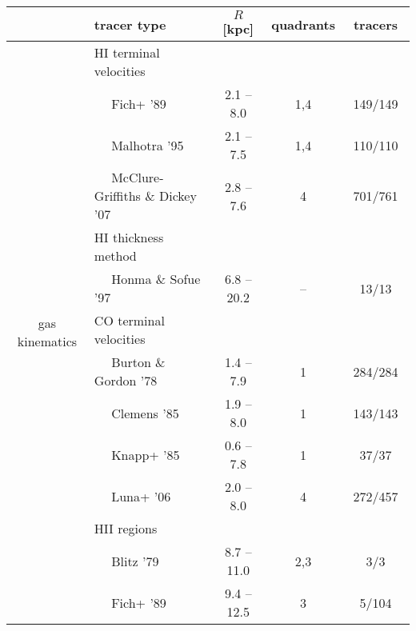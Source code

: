 \documentclass[twocolumn,prd,reprint,preprintnumbers,amsmath,amssymb,superscriptaddress,nofootinbib]{revtex4}
\begin{document}
\begin{table*}[htp]
\begin{center}
\begin{tabular}{|c|l c  c c|} 
\cline{2-5}
\multicolumn{1}{l|}{}			&	tracer type 		       							& $R$ [kpc]					& quadrants 	& $\quad$tracers$\quad$	\\
\hline
\multirow{19}{*}{gas kinematics} 	& HI terminal velocities 								&						& 		&	 					\\
					& $\quad$ Fich+ '89 \cite{Fich1989} 							& 2.1 -- 8.0					& 1,4		& 149/149	 				\\
					& $\quad$ Malhotra '95 \cite{Malhotra1995} 						& 2.1 -- 7.5				 	& 1,4		& 110/110  							\\
					& $\quad$ McClure-Griffiths \& Dickey '07 \cite{McClure-GriffithsDickey2007} 		& 2.8 -- 7.6				 	& 4		& 701/761 							\\
					& HI thickness method									&						&		&				\\
					& $\quad$ Honma \& Sofue '97 \cite{HonmaSofue1997} 					& \hspace{0.16cm}6.8 -- 20.2 			& --		& \hspace{0.16cm}13/13\hspace{0.16cm} 			\\
					& CO terminal velocities								&						& 		&					\\
					& $\quad$ Burton \& Gordon '78 \cite{BurtonGordon1978}  				& 1.4 -- 7.9				 	& 1		& 284/284  							\\
					& $\quad$ Clemens '85 \cite{Clemens1985}  						& 1.9 -- 8.0					& 1		& 143/143  						\\
					& $\quad$ Knapp+ '85 \cite{Knapp1985}  							& 0.6 -- 7.8				 	& 1		& \hspace{0.16cm}37/37\hspace{0.16cm} 					\\
					& $\quad$ Luna+ '06 \cite{Luna2006} 							& 2.0 -- 8.0				 	& 4		& 272/457  						\\
					& HII regions										&						&		&					\\
					& $\quad$ Blitz '79 \cite{Blitz1979} 							& \hspace{0.16cm}8.7 -- 11.0 			& 2,3		& \hspace{0.32cm}3/3\hspace{0.32cm} 					\\
					& $\quad$ Fich+ '89 \cite{Fich1989}  							& \hspace{0.16cm}9.4 -- 12.5 			& 3		& \hspace{0.32cm}5/104  					\\

\end{tabular}
\end{center}
\end{table*}
\end{document}
